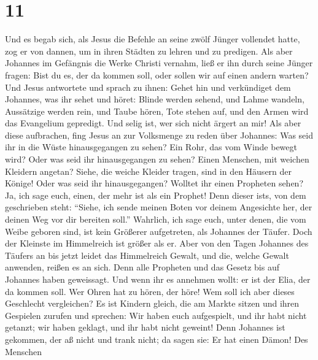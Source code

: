 \hypertarget{section-10}{%
\section{11}\label{section-10}}

 Und es begab sich, als Jesus die Befehle an seine zwölf
Jünger vollendet hatte, zog er von dannen, um in ihren Städten zu lehren
und zu predigen.  Als aber Johannes im Gefängnis die Werke
Christi vernahm, ließ er ihn durch seine Jünger fragen: 
Bist du es, der da kommen soll, oder sollen wir auf einen andern warten?
 Und Jesus antwortete und sprach zu ihnen: Gehet hin und
verkündiget dem Johannes, was ihr sehet und höret:  Blinde
werden sehend, und Lahme wandeln, Aussätzige werden rein, und Taube
hören, Tote stehen auf, und den Armen wird das Evangelium gepredigt.
 Und selig ist, wer sich nicht ärgert an mir!
 Als aber diese aufbrachen, fing Jesus an zur Volksmenge
zu reden über Johannes: Was seid ihr in die Wüste hinausgegangen zu
sehen? Ein Rohr, das vom Winde bewegt wird?  Oder was seid
ihr hinausgegangen zu sehen? Einen Menschen, mit weichen Kleidern
angetan? Siehe, die weiche Kleider tragen, sind in den Häusern der
Könige!  Oder was seid ihr hinausgegangen? Wolltet ihr
einen Propheten sehen? Ja, ich sage euch, einen, der mehr ist als ein
Prophet!  Denn dieser ist\textquotesingle s, von dem
geschrieben steht: ``Siehe, ich sende meinen Boten vor deinem Angesichte
her, der deinen Weg vor dir bereiten soll.''  Wahrlich,
ich sage euch, unter denen, die vom Weibe geboren sind, ist kein
Größerer aufgetreten, als Johannes der Täufer. Doch der Kleinste im
Himmelreich ist größer als er.  Aber von den Tagen
Johannes des Täufers an bis jetzt leidet das Himmelreich Gewalt, und
die, welche Gewalt anwenden, reißen es an sich.  Denn
alle Propheten und das Gesetz bis auf Johannes haben geweissagt.
 Und wenn ihr es annehmen wollt: er ist der Elia, der da
kommen soll.  Wer Ohren hat zu hören, der höre!
 Wem soll ich aber dieses Geschlecht vergleichen? Es ist
Kindern gleich, die am Markte sitzen und ihren Gespielen zurufen
 und sprechen: Wir haben euch aufgespielt, und ihr habt
nicht getanzt; wir haben geklagt, und ihr habt nicht geweint!
 Denn Johannes ist gekommen, der aß nicht und trank
nicht; da sagen sie: Er hat einen Dämon!  Des Menschen
